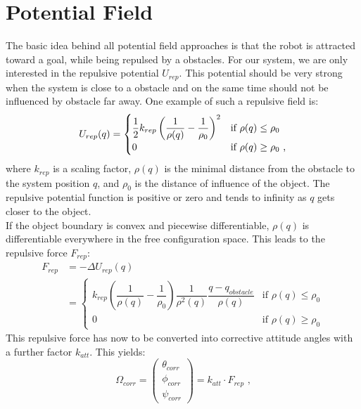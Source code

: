 \section{Potential Field}
\label{sec:potential field}
The basic idea behind all potential field approaches is that the robot is attracted toward a goal, while being repulsed by a obstacles. For our system, we are only interested in the repulsive potential $U_{rep}$. This potential should be very strong when the system is close to a obstacle and on the same time should not be influenced by obstacle far away. One example of such a repulsive field is:
\begin{equation}
\label{eq:pot field}
\centering
U_{rep}(q)=\begin{cases}
\dfrac{1}{2}k_{rep}\left(\dfrac{1}{\rho (q)}-\dfrac{1}{\rho_0}\right)^2 & \text{if } \rho(q)\leq\rho_0 \\
0 & \text{if } \rho(q)\geq\rho_0 \text{ ,}
\end{cases}
\end{equation}
where $k_{rep}$ is a scaling factor, $\rho(q)$ is the minimal distance from the obstacle to the system position $q$, and $\rho_0$ is the distance of influence of the object. The repulsive potential function is positive or zero and tends to infinity as $q$ gets closer to the object.\\
If the object boundary is convex and piecewise differentiable, $\rho(q)$ is differentiable everywhere in the free configuration space. This leads to the repulsive force $F_{rep}$:
\begin{equation}
\label{eq:force}
\begin{split}
F_{rep} &=-\Delta U_{rep}(q)\\
&=	\begin{cases}
k_{rep}\left(\dfrac{1}{\rho(q)}-\dfrac{1}{\rho_0}\right)\dfrac{1}{\rho^2(q)}\dfrac{q-q_{obstacle}}{\rho(q)} & \text{if }\rho(q)\leq\rho_0\\
0 & \text{if }\rho(q)\geq\rho_0
\end{cases}
\end{split}
\end{equation}
This repulsive force has now to be converted into corrective attitude angles with a further factor $k_{att}$. This yields: 
\begin{equation}
	\label{eq:angles}
	\Omega_{corr} =\begin{pmatrix}
	\theta_{corr} \\ \phi_{corr} \\ \psi_{corr}
	\end{pmatrix} = k_{att}\cdot F_{rep} \text{ ,}
\end{equation}
